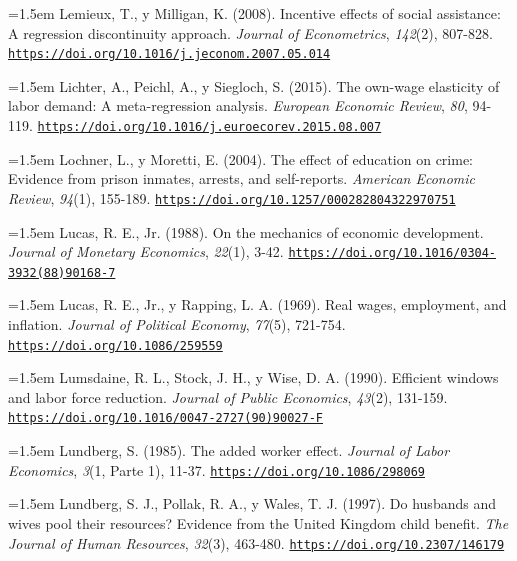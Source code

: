 \documentclass[10pt,a4paper]{article}
\begin{document}
\noindent\hangindent=1.5em Lemieux, T., y Milligan, K. (2008). Incentive effects of social assistance: A regression discontinuity approach. \textit{Journal of Econometrics}, \textit{142}(2), 807-828. \href{https://doi.org/10.1016/j.jeconom.2007.05.014}{\nolinkurl{https://doi.org/10.1016/j.jeconom.2007.05.014}}

\noindent\hangindent=1.5em Lichter, A., Peichl, A., y Siegloch, S. (2015). The own-wage elasticity of labor demand: A meta-regression analysis. \textit{European Economic Review}, \textit{80}, 94-119. \href{https://doi.org/10.1016/j.euroecorev.2015.08.007}{\nolinkurl{https://doi.org/10.1016/j.euroecorev.2015.08.007}}

\noindent\hangindent=1.5em Lochner, L., y Moretti, E. (2004). The effect of education on crime: Evidence from prison inmates, arrests, and self-reports. \textit{American Economic Review}, \textit{94}(1), 155-189. \href{https://doi.org/10.1257/000282804322970751}{\nolinkurl{https://doi.org/10.1257/000282804322970751}}

\noindent\hangindent=1.5em Lucas, R. E., Jr. (1988). On the mechanics of economic development. \textit{Journal of Monetary Economics}, \textit{22}(1), 3-42. \href{https://doi.org/10.1016/0304-3932(88)90168-7}{\nolinkurl{https://doi.org/10.1016/0304-3932(88)90168-7}}

\noindent\hangindent=1.5em Lucas, R. E., Jr., y Rapping, L. A. (1969). Real wages, employment, and inflation. \textit{Journal of Political Economy}, \textit{77}(5), 721-754. \href{https://doi.org/10.1086/259559}{\nolinkurl{https://doi.org/10.1086/259559}}

\noindent\hangindent=1.5em Lumsdaine, R. L., Stock, J. H., y Wise, D. A. (1990). Efficient windows and labor force reduction. \textit{Journal of Public Economics}, \textit{43}(2), 131-159. \href{https://doi.org/10.1016/0047-2727(90)90027-F}{\nolinkurl{https://doi.org/10.1016/0047-2727(90)90027-F}}

\noindent\hangindent=1.5em Lundberg, S. (1985). The added worker effect. \textit{Journal of Labor Economics}, \textit{3}(1, Parte 1), 11-37. \href{https://doi.org/10.1086/298069}{\nolinkurl{https://doi.org/10.1086/298069}}

\noindent\hangindent=1.5em Lundberg, S. J., Pollak, R. A., y Wales, T. J. (1997). Do husbands and wives pool their resources? Evidence from the United Kingdom child benefit. \textit{The Journal of Human Resources}, \textit{32}(3), 463-480. \href{https://doi.org/10.2307/146179}{\nolinkurl{https://doi.org/10.2307/146179}}
\end{document}
